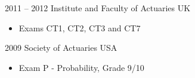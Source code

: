 \documentclass[
	a4paper,
]{fortysecondscv}
\begin{document}
		\begin{cvtable}[2]
			\cvitem
				{2011 -- 2012}
				{Institute and Faculty of Actuaries}
				{UK}
				{
					\vspace{-\topsep}
					\begin{itemize}[nosep, leftmargin=0pt, label={}]
						\item Exams CT1, CT2, CT3 and CT7
					\end{itemize}
				}
			\cvitem
				{2009}
				{Society of Actuaries}
				{USA}
				{
					\vspace{-\topsep}
					\begin{itemize}[nosep, leftmargin=0pt, label={}]
						\item Exam P - Probability, Grade 9/10
					\end{itemize}
				}
		\end{cvtable}

\end{document}
